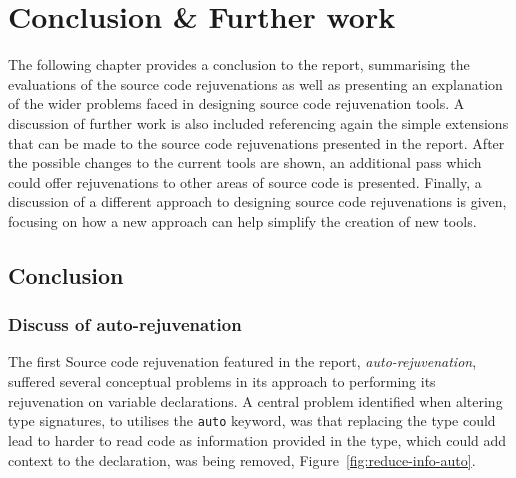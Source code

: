 \documentclass[bsc,frontabs,singlespacing,twoside,parskip,deptreport]{infthesis}
\begin{document}



\chapter{Conclusion \& Further work}
The following chapter provides a conclusion to the report, summarising the evaluations of the source code rejuvenations as well as presenting an explanation of the wider problems faced in designing source code rejuvenation tools. A discussion of further work is also included referencing again the simple extensions that can be made to the source code rejuvenations presented in the report. After the possible changes to the current tools are shown, an additional pass which could offer rejuvenations to other areas of source code is presented. Finally, a discussion of a different approach to designing source code rejuvenations is given, focusing on how a new approach can help simplify the creation of new tools. 

\section{Conclusion}
\subsection{Discuss of auto-rejuvenation}

The first Source code rejuvenation featured in the report, \textit{auto-rejuvenation}, suffered several conceptual problems in its approach to performing its rejuvenation on variable declarations. A central problem identified when altering type signatures, to utilises the \texttt{auto} keyword, was that replacing the type could lead to harder to read code as information provided in the type, which could add context to the declaration, was being removed, Figure~\ref{fig:reduce-info-auto}. 
\end{document}
